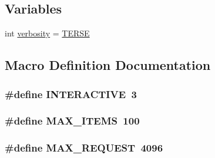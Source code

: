 \subsection*{Variables}
\begin{DoxyCompactItemize}
\item 
int \hyperlink{buddy-test_8c_a1bdcfae3209cbd96db35a2ae356fa15e}{verbosity} = \hyperlink{malloc-test_8c_ae70000f46dd84121830128e1701090ee}{T\+E\+R\+S\+E}
\end{DoxyCompactItemize}


\subsection{Macro Definition Documentation}
\hypertarget{buddy-test_8c_aa68dfac40a260bde9272c46bdf82613a}{}
\subsubsection[{I\+N\+T\+E\+R\+A\+C\+T\+I\+V\+E}]{\setlength{\rightskip}{0pt plus 5cm}\#define I\+N\+T\+E\+R\+A\+C\+T\+I\+V\+E~3}\label{buddy-test_8c_aa68dfac40a260bde9272c46bdf82613a}
\hypertarget{buddy-test_8c_a1b40ceb455086d9cdb68ed3d3bf2775f}{}
\subsubsection[{M\+A\+X\+\_\+\+I\+T\+E\+M\+S}]{\setlength{\rightskip}{0pt plus 5cm}\#define M\+A\+X\+\_\+\+I\+T\+E\+M\+S~100}\label{buddy-test_8c_a1b40ceb455086d9cdb68ed3d3bf2775f}
\hypertarget{buddy-test_8c_a79dc55ceff5acfd97aabd01db632a266}{}
\subsubsection[{M\+A\+X\+\_\+\+R\+E\+Q\+U\+E\+S\+T}]{\setlength{\rightskip}{0pt plus 5cm}\#define M\+A\+X\+\_\+\+R\+E\+Q\+U\+E\+S\+T~4096}\label{buddy-test_8c_a79dc55ceff5acfd97aabd01db632a266}
\hypertarget{buddy-test_8c_a404d5107b2cc06d2e236b7320df1fa7d}{}
